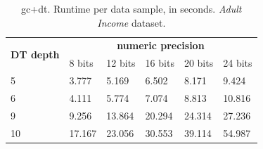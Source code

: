 \begin{table}[htp]
\centering
\caption{\acs{gc}+\acs{dt}. Runtime per data sample, in seconds. \emph{Adult Income} dataset.}
\label{table:runtimeDTAI}
\begin{tabular}{|l|l|l|l|l|l|}
\hline
\multirow{2}{*}{\textbf{DT depth}} & \multicolumn{5}{c|}{\textbf{numeric precision}}         \\ \cline{2-6} 
                          & 8 bits & 12 bits & 16 bits & 20 bits & 24 bits \\ \hline
5                         & 3.777  & 5.169   & 6.502   & 8.171   & 9.424   \\ \hline
6                         & 4.111  & 5.774   & 7.074   & 8.813   & 10.816  \\ \hline
9                         & 9.256  & 13.864  & 20.294  & 24.314  & 27.236  \\ \hline
10                        & 17.167 & 23.056  & 30.553  & 39.114  & 54.987  \\ \hline
\end{tabular}
\end{table}


